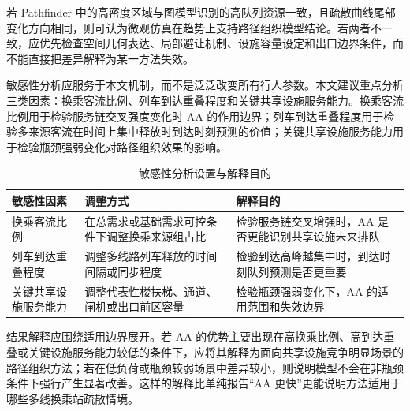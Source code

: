 \documentclass[UTF8,a4paper,12pt]{ctexart}
\begin{document}
若 Pathfinder 中的高密度区域与图模型识别的高队列资源一致，且疏散曲线尾部变化方向相同，则可认为微观仿真在趋势上支持路径组织模型结论。若两者不一致，应优先检查空间几何表达、局部避让机制、设施容量设定和出口边界条件，而不能直接把差异解释为某一方法失效。

敏感性分析应服务于本文机制，而不是泛泛改变所有行人参数。本文建议重点分析三类因素：换乘客流比例、列车到达重叠程度和关键共享设施服务能力。换乘客流比例用于检验服务链交叉强度变化时 AA 的作用边界；列车到达重叠程度用于检验多来源客流在时间上集中释放时到达时刻预测的价值；关键共享设施服务能力用于检验瓶颈强弱变化对路径组织效果的影响。

\begin{table}[htbp]
\centering
\caption{敏感性分析设置与解释目的}
\small
\begin{tabular}{p{}p{}p{}}
\toprule
敏感性因素 & 调整方式 & 解释目的 \\
\midrule
换乘客流比例 & 在总需求或基础需求可控条件下调整换乘来源组占比 & 检验服务链交叉增强时，AA 是否更能识别共享设施未来排队 \\
列车到达重叠程度 & 调整多线路列车释放的时间间隔或同步程度 & 检验到达高峰越集中时，到达时刻队列预测是否更重要 \\
关键共享设施服务能力 & 调整代表性楼扶梯、通道、闸机或出口前区容量 & 检验瓶颈强弱变化下，AA 的适用范围和失效边界 \\
\bottomrule
\end{tabular}
\end{table}

结果解释应围绕适用边界展开。若 AA 的优势主要出现在高换乘比例、高到达重叠或关键设施服务能力较低的条件下，应将其解释为面向共享设施竞争明显场景的路径组织方法；若在低负荷或瓶颈较弱场景中差异较小，则说明模型不会在非瓶颈条件下强行产生显著改善。这样的解释比单纯报告“AA 更快”更能说明方法适用于哪些多线换乘站疏散情境。
\end{document}
